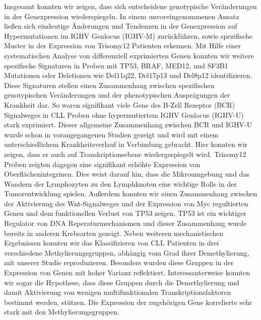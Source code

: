 \documentclass[a4paper,fontsize=12pt,headsepline]{scrartcl}
\begin{document}
Insgesamt konnten wir zeigen, dass sich entscheidene genotypische Veränderungen in der Genexpression wiederspiegeln. In einem unvoreingenommenen Ansatz ließen sich eindeutige Änderungen und Tendenzen in der  Genexpression auf Hypermutationen im IGHV Genlocus (IGHV-M) zurückführen, sowie spezifische Muster in der Expression von Trisomy12 Patienten erkennen. Mit Hilfe einer systematischen Analyse von differenziell exprimierten Genen konnten wir weitere spezifische Signaturen in Proben mit TP53, BRAF, MED12, und SF3B1 Mutationen oder Deletionen wie Del11q22, Del17p13 und Del8p12 identifizieren. Diese Signaturen stellen einen Zusammenhang zwischen spezifischen genotypischen Veränderungen und der phenotypischen Ausprägungen der Krankheit dar. So waren signifikant viele Gene des B-Zell Rezeptor (BCR) Signalweges in CLL Proben ohne hypermutiertem IGHV Genlocus (IGHV-U) stark exprimiert. Dieser allgemeine Zusammenhang zwischen BCR und IGHV-U wurde schon in vorangegangenen Studien gezeigt und wird mit einem unterschiedlichem Krankheitsverlauf in Verbindung gebracht. Hier konnten wir zeigen, dass er auch auf Transkriptionsebene wiedergespiegelt wird. Trisomy12 Proben zeigten dagegen eine signifikant erhöhte Expression von Oberflächenintegrinen. Dies weist darauf hin, dass die Mikroumgebung und das Wandern der Lymphozyten zu den Lymphknoten eine wichtige Rolle in der Tumorentwicklung spielen. Außerdem konnten wir einen Zusammenhang zwischen der Aktivierung des Wnt-Signalweges und der Expression von Myc regultierten Genen und dem funktionellen Verlust von TP53 zeigen. TP53 ist ein wichtiger Regulator von DNA Reperaturmechanismen und dieser Zusammenhang wurde bereits in anderen Krebsarten gezeigt. Neben weiteren mechanistischen Ergebnissen konnten wir das Klassifizieren von CLL Patienten in drei verschiedene Methylierungsgruppen, abhängig vom Grad ihrer Demethylierung, mit unserer Studie reproduzieren. Besonders wurden diese Gruppen in der Expression von Genen mit hoher Varianz reflektiert. Interessanterweise konnten wir sogar die Hypothese, dass diese Gruppen durch die Demethylierung und damit Aktivierung von wenigen multifunktionalen Transkriptionsfaktoren bestimmt werden, stützen. Die Expression der zugehörigen Gene korrelierte sehr stark mit den Methylierungsgruppen. \\ 
\end{document}
